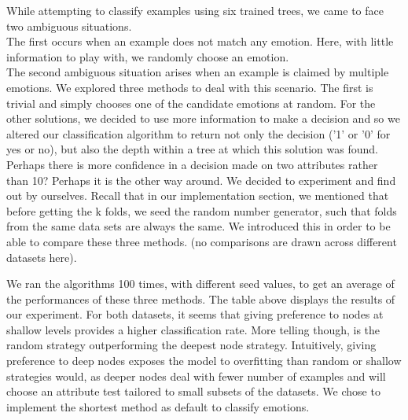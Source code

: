 While attempting to classify examples using six trained trees, we came to face two ambiguous situations.\\
The first occurs when an example does not match any emotion.
Here, with little information to play with, we randomly choose an emotion.\\
The second ambiguous situation arises when an example is claimed by multiple emotions.
We explored three methods to deal with this scenario.
The first is trivial and simply chooses one of the candidate emotions at random.
For the other solutions, we decided to use more information to make a decision and so we altered our classification algorithm
to return not only the decision ('1' or '0' for yes or no), but also the depth within a tree at which this solution was found.
Perhaps there is more confidence in a decision made on two attributes rather than 10? Perhaps it is the other way around.
We decided to experiment and find out by ourselves. Recall that in our implementation section, we mentioned that before getting
the k folds, we seed the random number generator, such that folds from the same data sets are always the same. We introduced this
in order to be able to compare these three methods. (no comparisons are drawn across different datasets here). \\



\newpage



We ran the algorithms 100 times, with different seed values, to get an average of the performances of these three methods.
The table above displays the results of our experiment.
For both datasets, it seems that giving preference to nodes at shallow levels provides a higher classification rate.
More telling though, is the random strategy outperforming the deepest node strategy.
Intuitively, giving preference to deep nodes exposes the model to overfitting than random or shallow strategies would, as deeper nodes
deal with fewer number of examples and will choose an attribute test tailored to small subsets of the datasets.
We chose to implement the shortest method as default to classify emotions.

